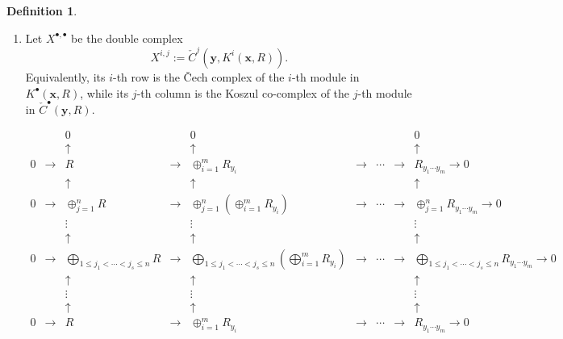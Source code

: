 \documentclass[12pt,twoside, final]{amsart}
\numberwithin{equation}{section}
\theoremstyle{definition}
\newtheorem{definition}[theorem]{Definition}
\begin{document}
\begin{definition}
\begin{enumerate}
See \cite[Theorem 5. 1. 20]{BS}.
 
\item
Let $X^{\bullet,\bullet}$ be the double complex
\[
X^{i,j}:=
\check C^j(\mathbf y,K^i(\mathbf x,R)).
\]
Equivalently, its $i$-th row is the \v{C}ech complex of the $i$-th
module in $K^\bullet(\mathbf x,R)$, while its $j$-th column is the
Koszul co-complex of the $j$-th module in
$\check C^\bullet(\mathbf y,R)$.

\[
\begin{array}{ccccccccc}

 & & 0 & & 0 & &   & & 0 \\[0.5em]
 & & \uparrow & & \uparrow & & & & \uparrow \\

0 & \longrightarrow &
R
& \longrightarrow &
\displaystyle\oplus_{i=1}^{m}R_{y_i}
& \longrightarrow &
\cdots
& \longrightarrow &
R_{y_1\cdots y_m}
\longrightarrow 0
\\[1.2em]

 & & \uparrow & & \uparrow & & & & \uparrow \\

0 & \longrightarrow &
\displaystyle\oplus_{j=1}^{n}R
& \longrightarrow &
\displaystyle\oplus_{j=1}^{n}
\left(\oplus_{i=1}^{m}R_{y_i}\right)
& \longrightarrow &
\cdots
& \longrightarrow &
\displaystyle\oplus_{j=1}^{n}R_{y_1\cdots y_m}
\longrightarrow 0
\\

 & & \vdots & & \vdots & & & & \vdots \\

 & & \uparrow & & \uparrow & & & & \uparrow \\

0 & \longrightarrow &
\displaystyle\bigoplus_{1\le j_1<\cdots<j_s\le n}R
& \longrightarrow &
\displaystyle\bigoplus_{1\le j_1<\cdots<j_s\le n}
\left(\bigoplus_{i=1}^{m}R_{y_i}\right)
& \longrightarrow &
\cdots
& \longrightarrow &
\displaystyle\bigoplus_{1\le j_1<\cdots<j_s\le n}
R_{y_1\cdots y_m}
\longrightarrow 0
\\

 & & \uparrow & & \uparrow & & & & \uparrow \\

 & & \vdots & & \vdots & & & & \vdots \\

 & & \uparrow & & \uparrow & & & & \uparrow \\

0 & \longrightarrow &
R
& \longrightarrow &
\displaystyle\oplus_{i=1}^{m}R_{y_i}
& \longrightarrow &
\cdots
& \longrightarrow &
R_{y_1\cdots y_m}
\longrightarrow 0
\\


\end{array}\]
\end{enumerate}
\end{definition}
\end{document}
